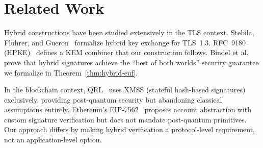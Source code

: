 \section{Related Work}


Hybrid constructions have been studied extensively in the TLS context.
Stebila, Fluhrer, and Gueron~\cite{stebila2020hybrid} formalize hybrid key exchange
for TLS~1.3. RFC~9180 (HPKE)~\cite{rfc9180} defines a KEM combiner that our
construction follows. Bindel et al.~\cite{bindel2019hybrid} prove that hybrid
signatures achieve the ``best of both worlds'' security guarantee we formalize in
Theorem~\ref{thm:hybrid-euf}.

In the blockchain context, QRL~\cite{qrl2018} uses XMSS (stateful hash-based
signatures) exclusively, providing post-quantum security but abandoning classical
assumptions entirely. Ethereum's EIP-7562~\cite{eip7562} proposes account abstraction
with custom signature verification but does not mandate post-quantum primitives. Our
approach differs by making hybrid verification a protocol-level requirement, not an
application-level option.

